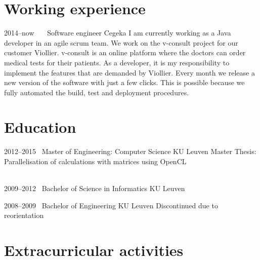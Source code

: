 \documentclass[a4paper]{friggeri-cv} %
\begin{document}
\section{Working experience}
\begin{entrylist}
\entry
{2014--now~~~}
{Software engineer}
{Cegeka}
{I am currently working as a Java developer in an agile scrum team. We work on the v-consult project for our customer Viollier. v-consult is an online platform where the doctors can order medical tests for their patients.
As a developer, it is my responsibility to implement the features that are demanded by Viollier. Every month we release a new version of the software with just a few clicks.
This is possible because we fully automated the build, test and deployment procedures.}

\end{entrylist}

\section{Education}

\begin{entrylist}
\entry
{2012--2015~}
{Master of Engineering: Computer Science}
{KU Leuven}
{Master Thesis: Parallelisation of calculations with matrices using OpenCL\\
~}


\entry
{2009--2012~}
{Bachelor of Science in Informatics}
{KU Leuven}
{~}

\entry
{2008--2009~}
{Bachelor of Engineering}
{KU Leuven}
{Discontinued due to reorientation}
\end{entrylist}



\section{Extracurricular activities}
\end{document}
